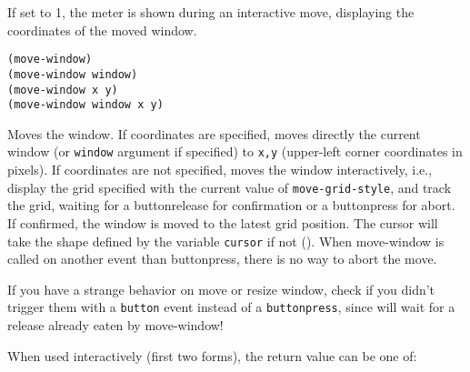 


If set to 1, the meter is shown during an interactive move,
displaying the coordinates of the moved window.

        
{\usagefont\begin{verbatim}
(move-window)
(move-window window)
(move-window x y)
(move-window window x y)
\end{verbatim}}\usageupspace

Moves the window. If coordinates are specified, moves directly the current
window (or \verb"window" argument if specified) to \verb"x,y" (upper-left
corner coordinates in pixels). If coordinates are not specified, moves the
window interactively, i.e., display the grid specified with the current
value of \verb"move-grid-style", and track the grid, waiting for a
buttonrelease for confirmation or a buttonpress for abort. If confirmed, the
window is moved to the latest grid position. The cursor will take the shape
defined by the variable \verb"cursor" if not ().  When move-window is called
on another event than buttonpress, there is no way to abort the move.

If you have a strange behavior on move or resize window, check if you
didn't trigger them with a \verb"button" event instead of a
\verb"buttonpress", since {\GWM} will wait for a release already eaten by
move-window!

When used interactively (first two forms), the return value can be one of:


